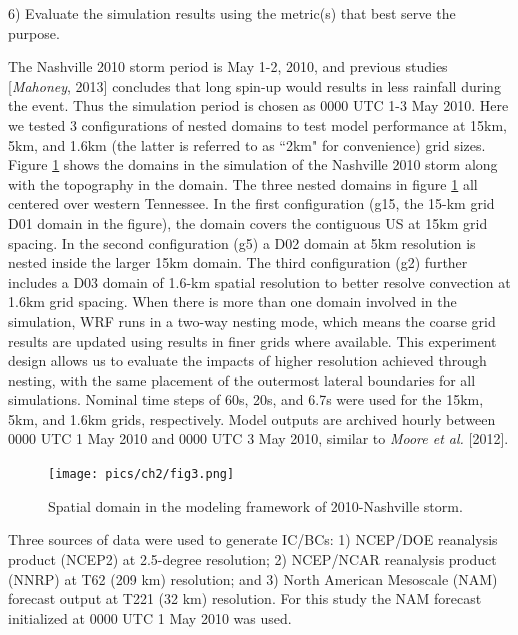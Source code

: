 6) Evaluate the simulation results using the metric(s) that best serve the purpose.

The Nashville 2010 storm period is May 1-2, 2010, and previous studies [\textit{Mahoney}, 2013] concludes that long spin-up would results in less rainfall during the event. Thus the simulation period is chosen as 0000 UTC 1-3 May 2010. Here we tested 3 configurations of nested domains to test model performance at 15km, 5km, and 1.6km (the latter is referred to as ``2km" for convenience) grid sizes. Figure \ref{fig:2-3} shows the domains in the simulation of the Nashville 2010 storm along with the topography in the domain. The three nested domains in figure \ref{fig:2-3} all centered over western Tennessee. In the first configuration (g15, the 15-km grid D01 domain in the figure), the domain covers the contiguous US at 15km grid spacing. In the second configuration (g5) a D02 domain at 5km resolution is nested inside the larger 15km domain. The third configuration (g2) further includes a D03 domain of 1.6-km spatial resolution to better resolve convection at 1.6km grid spacing. When there is more than one domain involved in the simulation, WRF runs in a two-way nesting mode, which means the coarse grid results are updated using results in finer grids where available. This experiment design allows us to evaluate the impacts of higher resolution achieved through nesting, with the same placement of the outermost lateral boundaries for all simulations. Nominal time steps of 60s, 20s, and 6.7s were used for the 15km, 5km, and 1.6km grids, respectively.  Model outputs are archived hourly between 0000 UTC 1 May 2010 and 0000 UTC 3 May 2010, similar to \textit{Moore et al.} [2012].

\begin{figure}
  \texttt{[image: pics/ch2/fig3.png]}
  \caption{Spatial domain in the modeling framework of 2010-Nashville storm.}
  \label{fig:2-3}
\end{figure}

Three sources of data were used to generate IC/BCs: 1) NCEP/DOE reanalysis product (NCEP2) at 2.5-degree resolution; 2) NCEP/NCAR reanalysis product (NNRP) at T62 (209 km) resolution; and 3) North American Mesoscale (NAM) forecast output at T221 (32 km) resolution. For this study the NAM forecast initialized at 0000 UTC 1 May 2010 was used.

